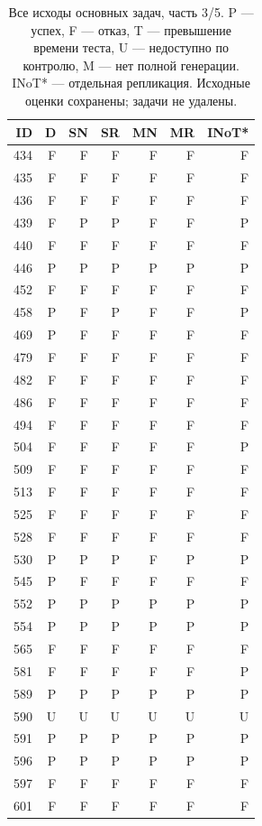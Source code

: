 \begin{table}[!htbp]\centering\footnotesize
\caption{Все исходы основных задач, часть 3/5. P --- успех, F --- отказ, T --- превышение времени теста, U --- недоступно по контролю, M --- нет полной генерации. INoT* --- отдельная репликация. Исходные оценки сохранены; задачи не удалены.}
\begin{tabular*}{\textwidth}{@{\extracolsep{\fill}}rrrrrrr}\toprule
ID & D & SN & SR & MN & MR & INoT*\\\midrule
434 & F & F & F & F & F & F\\
435 & F & F & F & F & F & F\\
436 & F & F & F & F & F & F\\
439 & F & P & P & F & F & P\\
440 & F & F & F & F & F & F\\
446 & P & P & P & P & P & P\\
452 & F & F & F & F & F & F\\
458 & P & F & P & F & F & P\\
469 & P & F & F & F & F & F\\
479 & F & F & F & F & F & F\\
482 & F & F & F & F & F & F\\
486 & F & F & F & F & F & F\\
494 & F & F & F & F & F & F\\
504 & F & F & F & F & F & P\\
509 & F & F & F & F & F & F\\
513 & F & F & F & F & F & F\\
525 & F & F & F & F & F & F\\
528 & F & F & F & F & F & F\\
530 & P & P & P & F & P & P\\
545 & P & F & F & F & F & F\\
552 & P & P & P & P & P & P\\
554 & P & P & P & P & P & P\\
565 & F & F & F & F & F & F\\
581 & F & F & F & F & F & P\\
589 & P & P & P & P & P & P\\
590 & U & U & U & U & U & U\\
591 & P & P & P & P & P & P\\
596 & P & P & P & P & P & P\\
597 & F & F & F & F & F & F\\
601 & F & F & F & F & F & F\\

\end{tabular*}
\end{table}
